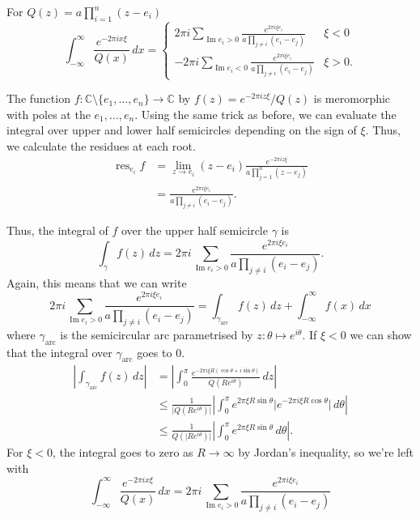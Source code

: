 \documentclass[12 pt, letterpaper]{hmcpset}
\begin{document}
\begin{solution}
	For $Q(z) = a \prod_{i = 1}^{n} (z - e_{i})$
	\[
		\boxed{
			\int_{-\infty}^{\infty} \frac{e^{-2 \pi i x \xi}}{Q(x)} \, dx = \begin{cases}
				\displaystyle 2 \pi i \sum_{\operatorname{Im} e_{i} > 0} \frac{e^{2 \pi i \xi e_{i}}}{a \prod_{j \neq i} (e_{i} - e_{j})} & \xi < 0 \\
				\displaystyle - 2 \pi i \sum_{\operatorname{Im} e_{i} < 0} \frac{e^{2 \pi i \xi e_{i}}}{a \prod_{j \neq i} (e_{i} - e_{j})} & \xi > 0.
			\end{cases}
		}
	\]

	The function $f : \mathbb{C} \setminus \{ e_{1}, \dots, e_{n} \} \to \mathbb{C}$ by $f(z) = e^{-2 \pi i z \xi} / Q(z)$ is meromorphic with poles at the $e_{1}, \dots, e_{n}$. Using the same trick as before, we can evaluate the integral over upper and lower half semicircles depending on the sign of $\xi$. Thus, we calculate the residues at each root.
	\[
		\begin{split}
			\operatorname{res}_{e_{i}} f & = \lim_{z \to e_{i}} (z - e_{i}) \frac{e^{-2 \pi i z \xi}}{a \prod_{j = 1}^{n} (z - e_{j})} \\
						     & = \frac{e^{2 \pi i \xi e_{i}}}{a \prod_{j \neq i} (e_{i} - e_{j})}.
		\end{split}
	\]

	Thus, the integral of $f$ over the upper half semicircle $\gamma$ is
	\[
		\int_{\gamma} f(z) \, dz = 2 \pi i \sum_{\operatorname{Im} e_{i} > 0} \frac{e^{2 \pi i \xi e_{i}}}{a \prod_{j \neq i} (e_{i} - e_{j})}.
	\]
	Again, this means that we can write
	\[
		2 \pi i \sum_{\operatorname{Im} e_{i} > 0} \frac{e^{2 \pi i \xi e_{i}}}{a \prod_{j \neq i} (e_{i} - e_{j})} = \int_{\gamma_{\text{arc}}} f(z) \, dz + \int_{-\infty}^{\infty} f(x) \, dx
	\]
	where $\gamma_{\text{arc}}$ is the semicircular arc parametrised by $z : \theta \mapsto e^{i \theta}$. If $\xi < 0$ we can show that the integral over $\gamma_{\text{arc}}$ goes to $0$.
	\begin{align*}
		\left \lvert \int_{\gamma_{\text{arc}}} f(z) \, dz \right \rvert & = \left \lvert \int_{0}^{\pi} \frac{e^{-2 \pi i \xi R (\cos{\theta} + i \sin{\theta})}}{Q(R e^{i \theta})} \, dz \right \rvert \\
										 & \le \frac{1}{\lvert Q(R e^{i \theta}) \rvert} \left \lvert \int_{0}^{\pi} e^{2 \pi \xi R \sin{\theta}} \lvert e^{-2 \pi i \xi R \cos{\theta}} \rvert \, d\theta \right \rvert \\
										 & \le \frac{1}{Q(\lvert R e^{i \theta}) \rvert} \left \lvert \int_{0}^{\pi} e^{2 \pi \xi R \sin{\theta}} \, d\theta 
 \right \rvert.
	\end{align*}
	For $\xi < 0$, the integral goes to zero as $R \to \infty$ by Jordan's inequality, so we're left with
	\[
		\int_{-\infty}^{\infty} \frac{e^{-2 \pi i x \xi}}{Q(x)} \, dx = 2 \pi i \sum_{\operatorname{Im} e_{i} > 0} \frac{e^{2 \pi i \xi e_{i}}}{a \prod_{j \neq i} (e_{i} - e_{j})}
	\]


\end{solution}
\end{document}
